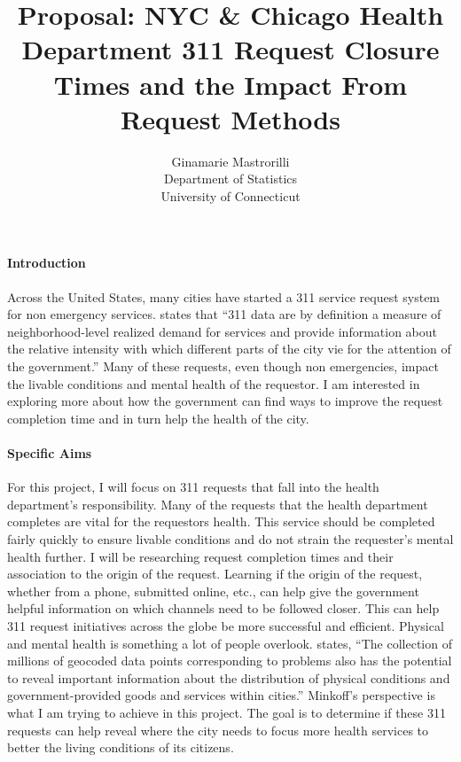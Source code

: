 \documentclass[12pt]{article}
\title{Proposal: NYC & Chicago Health Department 311 Request Closure Times and the Impact From Request Methods }
\author{Ginamarie Mastrorilli\\
  Department of Statistics\\
  University of Connecticut
}
\begin{document}
\maketitle


\paragraph{Introduction}
Across the United States, many cities have started a 311 service request system for non emergency services. 
\cite{white2018promises} states that “311 data are by definition a measure of neighborhood-level realized demand for services and provide information about the relative intensity with which different parts of the city vie for the attention of the government.” 
Many of these requests, even though non emergencies, impact the livable conditions and mental health of the requestor. 
I am interested in exploring more about how the government can find ways to improve the request completion time and in turn help the health of the city. 


\paragraph{Specific Aims}
For this project, I will focus on 311 requests that fall into the health department’s responsibility.
Many of the requests that the health department completes are vital for the requestors health. This service should be completed fairly quickly to ensure livable conditions and do not strain the requester's mental health further. 
I will be researching request completion times and their association to the origin of the request. 
Learning if the origin of the request, whether from a phone, submitted online, etc., can help give the government helpful information on which channels need to be followed closer. 
This can help 311 request initiatives across the globe be more successful and efficient. 
Physical and mental health is something a lot of people overlook. 
\cite{minkoff2016nyc} states, “The collection of millions of geocoded data points corresponding to problems also has the potential to reveal important information about the distribution of physical conditions and government-provided goods and services within cities.” 
Minkoff’s perspective is what I am trying to achieve in this project. 
The goal is to determine if these 311 requests can help reveal where the city needs to focus more health services to better the living conditions of its citizens. 
\end{document}
